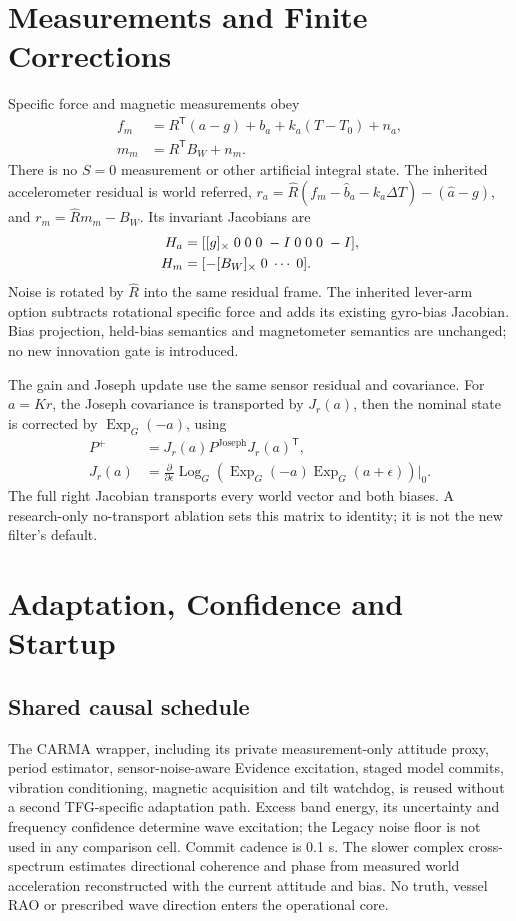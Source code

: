 \documentclass[conference]{IEEEtran}
\newcommand{\T}{^{\mathsf T}}\newcommand{\Hh}{^{\mathsf H}}
\DeclareMathOperator{\Exp}{Exp}\DeclareMathOperator{\Log}{Log}
\begin{document}
\section{Measurements and Finite Corrections}
Specific force and magnetic measurements obey
\begin{align}
 f_m&=R\T(a-g)+b_a+k_a(T-T_0)+n_a,\\
 m_m&=R\T B_W+n_m.
\end{align}
There is no $S=0$ measurement or other artificial integral state. The inherited
accelerometer residual is world referred,
$r_a=\hat R(f_m-\hat b_a-k_a\Delta T)-(\hat a-g)$, and
$r_m=\hat Rm_m-B_W$. Its invariant Jacobians are
\begin{align}
 H_a&=[[g]_\times\;0\;0\;0\;-I\;0\;0\;0\;-I],\\
 H_m&=[-[B_W]_\times\;0\;\cdots\;0].
\end{align}
Noise is rotated by $\hat R$ into the same residual frame. The inherited
lever-arm option subtracts rotational specific force and adds its existing
gyro-bias Jacobian. Bias projection, held-bias semantics and magnetometer
semantics are unchanged; no new innovation gate is introduced.

The gain and Joseph update use the same sensor residual and covariance.
For $a=Kr$, the Joseph covariance is transported by $J_r(a)$, then the
nominal state is corrected by $\Exp_G(-a)$, using
\begin{align}
 P^+&=J_r(a)P^{\mathrm{Joseph}}J_r(a)\T,\\
 J_r(a)&=\frac{\partial}{\partial\epsilon}
 \Log_G\!\left(\Exp_G(-a)\Exp_G(a+\epsilon)\right)\Big|_0 .
\end{align}
The full right Jacobian transports every world vector and both biases. A
research-only no-transport ablation sets this matrix to identity; it is not the
new filter's default.

\section{Adaptation, Confidence and Startup}
\subsection{Shared causal schedule}
The CARMA wrapper, including its private measurement-only attitude proxy,
period estimator, sensor-noise-aware Evidence excitation, staged model commits,
vibration conditioning, magnetic acquisition and tilt watchdog, is reused
without a second TFG-specific adaptation path. Excess band energy, its
uncertainty and frequency confidence determine wave excitation; the Legacy
noise floor is not used in any comparison cell. Commit cadence is 0.1 s.
The slower complex cross-spectrum estimates directional coherence and phase
from measured world acceleration reconstructed with the current attitude and
bias. No truth, vessel RAO or prescribed wave direction enters the operational
core.
\end{document}
